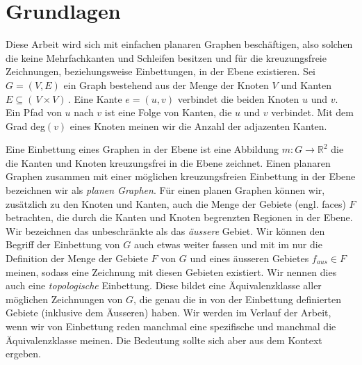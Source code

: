 \chapter{Grundlagen}\label{pre}

Diese Arbeit wird sich mit einfachen planaren Graphen beschäftigen, also solchen die keine Mehrfachkanten und Schleifen besitzen und für die kreuzungsfreie Zeichnungen, beziehungsweise Einbettungen, in der Ebene existieren. Sei $G = (V,E)$ ein Graph bestehend aus der Menge der Knoten $V$ und Kanten $E \subseteq ( \,V \times V ) \,$. Eine Kante $e=(u,v)$ verbindet die beiden Knoten $u$ und $v$. Ein Pfad von $u$ nach $v$ ist eine Folge von Kanten, die $u$ und $v$ verbindet. Mit dem Grad deg$(v)$ eines Knoten meinen wir die Anzahl der adjazenten Kanten.

Eine Einbettung eines Graphen in der Ebene ist eine Abbildung $m:G\to\mathbb{R}^2$ die die Kanten und Knoten kreuzungsfrei in die Ebene zeichnet. Einen planaren Graphen zusammen mit einer möglichen kreuzungsfreien Einbettung in der Ebene bezeichnen wir als \textit{planen Graphen}. Für einen planen Graphen können wir, zusätzlich zu den Knoten und Kanten, auch die Menge der Gebiete (engl. faces) $F$ betrachten, die durch die Kanten und Knoten begrenzten Regionen in der Ebene. Wir bezeichnen das unbeschränkte als das \textit{äussere} Gebiet. Wir können den Begriff der Einbettung von $G$ auch etwas weiter fassen und mit im nur die Definition der Menge der Gebiete $F$ von $G$ und eines äusseren Gebietes $f_{aus} \in F$ meinen, sodass eine Zeichnung mit diesen Gebieten existiert. Wir nennen dies auch eine \textit{topologische} Einbettung. Diese bildet eine Äquivalenzklasse aller möglichen Zeichnungen von $G$, die genau die in von der Einbettung definierten Gebiete (inklusive dem Äusseren) haben. Wir werden im Verlauf der Arbeit, wenn wir von Einbettung reden manchmal eine spezifische und manchmal die Äquivalenzklasse meinen. Die Bedeutung sollte sich aber aus dem Kontext ergeben.





